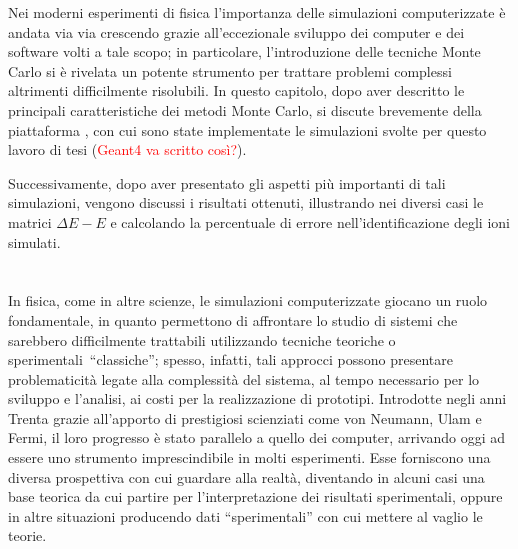






Nei moderni esperimenti di fisica l'importanza delle simulazioni computerizzate è andata via via crescendo grazie all'eccezionale sviluppo dei computer e dei software volti a tale scopo; in particolare, l'introduzione delle tecniche Monte Carlo si è rivelata un potente strumento per trattare problemi complessi altrimenti difficilmente risolubili.
In questo capitolo, dopo aver descritto le principali caratteristiche dei metodi Monte Carlo, si discute brevemente della piattaforma \geant, con cui sono state implementate le simulazioni svolte per questo lavoro di tesi (\textcolor{red}{Geant4 va scritto così?}).

Successivamente, dopo aver presentato gli aspetti più importanti di tali simulazioni, vengono discussi i risultati ottenuti, illustrando nei diversi casi le matrici $\Delta E - E$ e calcolando la percentuale di errore nell'identificazione degli ioni simulati.






\section{}


In fisica, come in altre scienze, le simulazioni computerizzate giocano un ruolo fondamentale, in quanto permettono di affrontare lo studio di sistemi che sarebbero difficilmente trattabili utilizzando tecniche teoriche o sperimentali~``classiche'';
spesso, infatti, tali approcci possono presentare problematicità legate alla complessità del sistema, al tempo necessario per lo sviluppo e l'analisi, ai costi per la realizzazione di prototipi.
Introdotte negli anni Trenta grazie all'apporto di prestigiosi scienziati come von Neumann, Ulam e Fermi, il loro progresso è stato parallelo a quello dei computer, arrivando oggi ad essere uno strumento imprescindibile in molti esperimenti.
Esse forniscono una diversa prospettiva con cui guardare alla realtà, diventando in alcuni casi una base teorica da cui partire per l'interpretazione dei risultati sperimentali, oppure in altre situazioni producendo dati ``sperimentali'' con cui mettere al vaglio le teorie.



